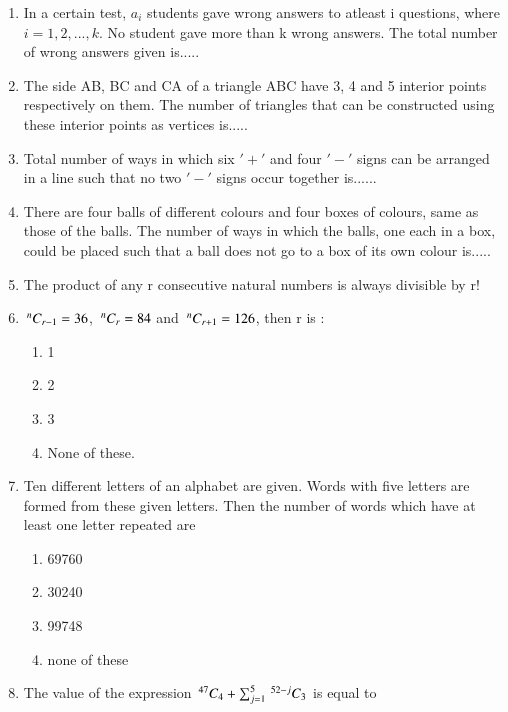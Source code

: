 \renewcommand{\theequation}{\theenumi}
\begin{enumerate}[label=\arabic*.,ref=\thesubsection.\theenumi]
\item In a certain test, $a_i$ students gave wrong answers to atleast i questions, where $i = 1,2,...,k.$ No student gave more than k wrong answers. The total number of wrong answers given is.....\\
\item The side AB, BC and CA of a triangle ABC have 3, 4 and 5 interior points respectively on them. The number of triangles that can be constructed using these interior points as vertices is.....\\
\item Total number of ways in which six $'+'$ and four $'-'$ signs can be arranged in a line such that no two $'-'$ signs occur together is......\\
\item There are four balls of different colours and four boxes of colours, same as those of the balls. The number of ways in which the balls, one each in a box, could be placed such that a ball does not go to a box of its own colour is.....\\
\item The product of any r consecutive natural numbers is always divisible by r!\\
\item $\,^{n}C_{r-1} = 36$, $\,^{n}C_{r} = 84$ and $\,^{n}C_{r+1} = 126$, then r is :
\begin{enumerate}
\item 1
\item 2
\item 3
\item None of these.\\
\end{enumerate}
\item Ten different letters of an alphabet are given. Words with five letters are formed from these given letters. Then the number of words which have at least one letter repeated are
\begin{enumerate}
\item 69760
\item 30240
\item 99748
\item none of these\\
\end{enumerate}
\item The value of the expression $\,^{47}C_{4}+\sum_{j=1}^{5} \,^{52-j}C_{3}$ is equal to

\end{enumerate}

